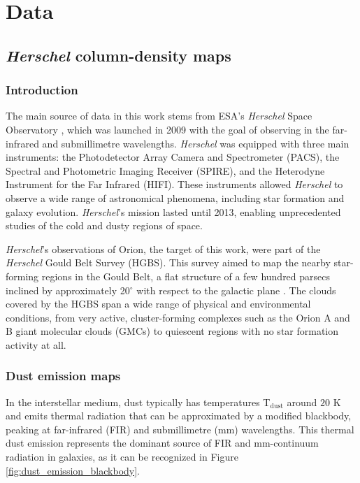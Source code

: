 \chapter{Data}
\label{chap:data}
\section{\textit{Herschel} column-density maps}
\subsection{Introduction}
The main source of data in this work stems from ESA's \textit{Herschel} Space Observatory \cite{pilbratt2010herschel}, which was launched in 2009 with the goal of observing in the far-infrared and submillimetre wavelengths. 
\textit{Herschel} was equipped with three main instruments: the Photodetector Array Camera and Spectrometer (PACS), the Spectral and Photometric Imaging Receiver (SPIRE), and the Heterodyne Instrument for the Far Infrared (HIFI). These instruments allowed \textit{Herschel} to observe a wide range of astronomical phenomena, including star formation and galaxy evolution.
\textit{Herschel}'s mission lasted until 2013, enabling unprecedented studies of the cold and dusty regions of space.

\textit{Herschel}'s observations of Orion, the target of this work, were part of the \textit{Herschel} Gould Belt Survey (HGBS). This survey aimed to map the nearby star-forming regions in the Gould Belt, a flat structure of a few hundred parsecs inclined by approximately 20$^{\circ}$ with respect to the galactic plane \cite{andre2010herschel}.
The clouds covered by the HGBS span a wide range of physical and environmental conditions, from very active, cluster-forming complexes such as the Orion A and B giant molecular clouds (GMCs) to quiescent regions with no star formation activity at all.

\subsection{Dust emission maps}
In the interstellar medium, dust typically has temperatures T$_{\mathrm{dust}}$ around $20$ K and emits thermal radiation that can be approximated by a modified blackbody, peaking at far-infrared (FIR) and submillimetre (mm) wavelengths. 
This thermal dust emission represents the dominant source of FIR and mm-continuum radiation in galaxies, as it can be recognized in Figure \ref{fig:dust_emission_blackbody}. 

